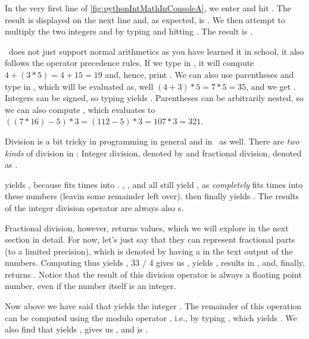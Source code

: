 In the very first line of \cref{fig:pythonIntMathInConsoleA}, we enter  and hit \keys{\enter}.
The result is displayed on the next line and, as expected, is .
We then attempt to multiply the two integers  and  by typing  and hitting \keys{\enter}.
The result is .

\python\ does not just support normal arithmetics as you have learned it in school, it also follows the operator precedence rules.
If we type in , it will compute $4+(3*5)=4+15=19$ and, hence, print .
We can also use parentheses and type in , which will be evaluated as, well $(4+3)*5=7*5=35$, and we get .
Integers can be signed, so typing  yields .
Parentheses can be arbitrarily nested, so we can also compute , which evaluates to $((7 * 16) - 5) * 3 = (112-5)*3=107*3=321$.

Division is a bit tricky in programming in general and in \python\ as well.
There are \emph{two kinds} of division in \python: Integer division, denoted by \pythonil{//} and fractional division, denoted as \pythonil{/}.

 yields , because  fits  times into .
, , and  all still yield , as  \emph{completely} fits  times into these numbers (leavin some remainder left over).
 then finally yields .
The results of the integer division operator \pythonil{//} are always also s.

Fractional division, however, returns  values, which we will explore in the next section in detail.
For now, let's just say that they can represent fractional parts (to a limited precision), which is denoted by having a  in the text output of the numbers.
Computing  thus yields , {33 / 4} gives us ,  yields ,  results in , and, finally,  returns .
Notice that the result of this division operator is always a floating point number, even if the number itself is an integer.

Now above we have said that  yields the integer .
The remainder of this operation can be computed using the modulo operator \pythonil{\%}, i.e., by typing , which yields .
We also find that  yields ,  gives us , and  is .

